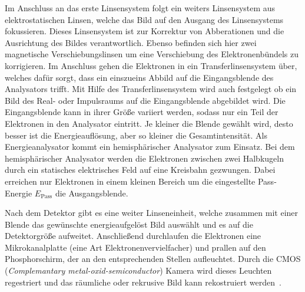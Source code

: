         Im Anschluss an das erste Linsensystem folgt ein weiters Linsensystem aus elektrostatischen Linsen, welche das Bild auf den Ausgang des Linsensystems fokussieren.
        Dieses Linsensystem ist zur Korrektur von Abberationen und die Ausrichtung des Bildes verantwortlich.
        Ebenso befinden sich hier zwei magnetische Verschiebungslinsen um eine Verschiebung des Elektronenbündels zu korrigieren.
        Im Anschluss gehen die Elektronen in ein Transferlinsensystem über, welches dafür sorgt, dass ein einszueins Abbild auf die Eingangsblende des Analysators trifft.
        Mit Hilfe des Transferlinsensystem wird auch festgelegt ob ein Bild des Real- oder Impulsraums auf die Eingangsblende abgebildet wird.
        Die Eingangsblende kann in ihrer Größe variiert werden, sodass nur ein Teil der Elektronen in den Analysator eintritt.
        Je kleiner die Blende gewählt wird, desto besser ist die Energieauflösung, aber so kleiner die Gesamtintensität.
        Als Energieanalysator kommt ein hemisphärischer Analysator zum Einsatz.
        Bei dem hemisphärischer Analysator werden die Elektronen zwischen zwei Halbkugeln durch ein statisches elektrisches Feld auf eine Kreisbahn gezwungen.
        Dabei erreichen nur Elektronen in einem kleinen Bereich um die eingestellte Pass-Energie $E_\text{Pass}$ die Ausgangsblende.
        
        Nach dem Detektor gibt es eine weiter Linseneinheit, welche zusammen mit einer Blende das gewünschte energieaufgelöst Bild auswählt und es auf die Detektorgröße aufweitet.
        Anschließend durchlaufen die Elektronen eine Mikrokanalplatte (eine Art Elektronenvervielfacher) und prallen auf den Phosphorschirm, der an den entsprechenden Stellen aufleuchtet.
        Durch die CMOS (\textit{Complemantary metal-oxid-semiconductor}) Kamera wird dieses Leuchten regestriert und das räumliche oder rekrusive Bild kann rekostruiert werden~\cite{SPECS-MM}.
        
